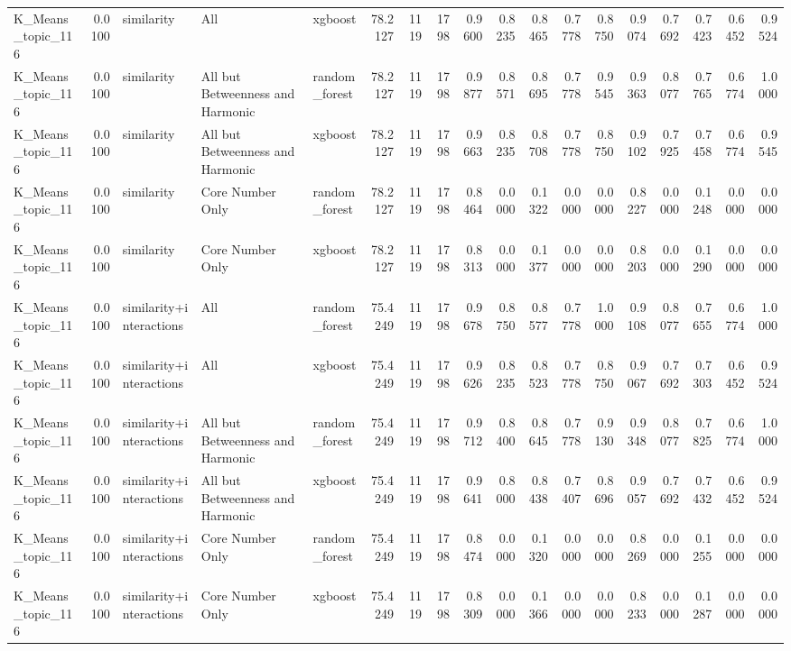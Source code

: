 \begin{tabular}{lrlllrrrrrrrrrrrrr}
K_Means_topic_116 & 0.0100 & similarity & All & xgboost & 78.2127 & 1119 & 1798 & 0.9600 & 0.8235 & 0.8465 & 0.7778 & 0.8750 & 0.9074 & 0.7692 & 0.7423 & 0.6452 & 0.9524 \\
K_Means_topic_116 & 0.0100 & similarity & All but Betweenness and Harmonic & random_forest & 78.2127 & 1119 & 1798 & 0.9877 & 0.8571 & 0.8695 & 0.7778 & 0.9545 & 0.9363 & 0.8077 & 0.7765 & 0.6774 & 1.0000 \\
K_Means_topic_116 & 0.0100 & similarity & All but Betweenness and Harmonic & xgboost & 78.2127 & 1119 & 1798 & 0.9663 & 0.8235 & 0.8708 & 0.7778 & 0.8750 & 0.9102 & 0.7925 & 0.7458 & 0.6774 & 0.9545 \\
K_Means_topic_116 & 0.0100 & similarity & Core Number Only & random_forest & 78.2127 & 1119 & 1798 & 0.8464 & 0.0000 & 0.1322 & 0.0000 & 0.0000 & 0.8227 & 0.0000 & 0.1248 & 0.0000 & 0.0000 \\
K_Means_topic_116 & 0.0100 & similarity & Core Number Only & xgboost & 78.2127 & 1119 & 1798 & 0.8313 & 0.0000 & 0.1377 & 0.0000 & 0.0000 & 0.8203 & 0.0000 & 0.1290 & 0.0000 & 0.0000 \\
K_Means_topic_116 & 0.0100 & similarity+interactions & All & random_forest & 75.4249 & 1119 & 1798 & 0.9678 & 0.8750 & 0.8577 & 0.7778 & 1.0000 & 0.9108 & 0.8077 & 0.7655 & 0.6774 & 1.0000 \\
K_Means_topic_116 & 0.0100 & similarity+interactions & All & xgboost & 75.4249 & 1119 & 1798 & 0.9626 & 0.8235 & 0.8523 & 0.7778 & 0.8750 & 0.9067 & 0.7692 & 0.7303 & 0.6452 & 0.9524 \\
K_Means_topic_116 & 0.0100 & similarity+interactions & All but Betweenness and Harmonic & random_forest & 75.4249 & 1119 & 1798 & 0.9712 & 0.8400 & 0.8645 & 0.7778 & 0.9130 & 0.9348 & 0.8077 & 0.7825 & 0.6774 & 1.0000 \\
K_Means_topic_116 & 0.0100 & similarity+interactions & All but Betweenness and Harmonic & xgboost & 75.4249 & 1119 & 1798 & 0.9641 & 0.8000 & 0.8438 & 0.7407 & 0.8696 & 0.9057 & 0.7692 & 0.7432 & 0.6452 & 0.9524 \\
K_Means_topic_116 & 0.0100 & similarity+interactions & Core Number Only & random_forest & 75.4249 & 1119 & 1798 & 0.8474 & 0.0000 & 0.1320 & 0.0000 & 0.0000 & 0.8269 & 0.0000 & 0.1255 & 0.0000 & 0.0000 \\
K_Means_topic_116 & 0.0100 & similarity+interactions & Core Number Only & xgboost & 75.4249 & 1119 & 1798 & 0.8309 & 0.0000 & 0.1366 & 0.0000 & 0.0000 & 0.8233 & 0.0000 & 0.1287 & 0.0000 & 0.0000 \\

\end{tabular}
